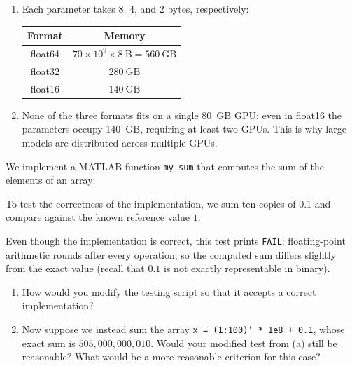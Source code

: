 \begin{solution}
    \begin{enumerate}[label=(\alph*)]
        \item Each parameter takes 8, 4, and 2 bytes, respectively:
        \begin{center}
        \begin{tabular}{c|c}
            Format & Memory \\
            \hline
            float64 & $70 \times 10^9 \times 8~\text{B} = 560~\text{GB}$ \\
            float32 & $280~\text{GB}$ \\
            float16 & $140~\text{GB}$ \\
        \end{tabular}
        \end{center}
        \item None of the three formats fits on a single 80~GB GPU; even in float16 the parameters occupy 140~GB, requiring at least two GPUs. This is why large models are distributed across multiple GPUs.
    \end{enumerate}
\end{solution}

\begin{exercise}
    We implement a MATLAB function \texttt{my\_sum} that computes the sum of the elements of an array:
    
    To test the correctness of the implementation, we sum ten copies of $0.1$ and compare against the known reference value $1$:
    
    Even though the implementation is correct, this test prints \texttt{FAIL}: floating-point arithmetic rounds after every operation, so the computed sum differs slightly from the exact value (recall that $0.1$ is not exactly representable in binary).
    \begin{enumerate}[label=(\alph*)]
        \item How would you modify the testing script so that it accepts a correct implementation?
        \item Now suppose we instead sum the array \texttt{x = (1:100)' * 1e8 + 0.1}, whose exact sum is $505{,}000{,}000{,}010$. Would your modified test from (a) still be reasonable? What would be a more reasonable criterion for this case?
    \end{enumerate}
\end{exercise}

